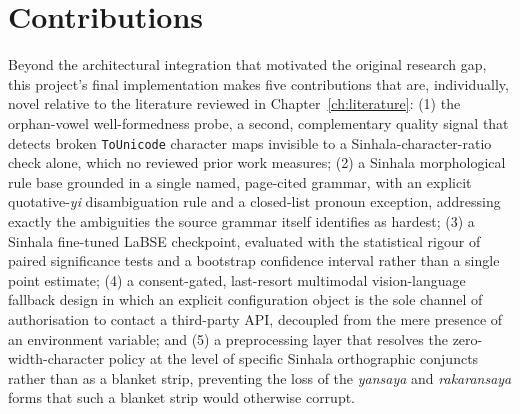 \documentclass[12pt,a4paper,oneside]{report}
\begin{document}
\section{Contributions}
\label{sec:concl-contributions}
Beyond the architectural integration that motivated the original research gap, this project's final implementation makes five contributions that are, individually, novel relative to the literature reviewed in Chapter~\ref{ch:literature}: (1) the orphan-vowel well-formedness probe, a second, complementary quality signal that detects broken \texttt{ToUnicode} character maps invisible to a Sinhala-character-ratio check alone, which no reviewed prior work measures; (2) a Sinhala morphological rule base grounded in a single named, page-cited grammar, with an explicit quotative-\textit{yi} disambiguation rule and a closed-list pronoun exception, addressing exactly the ambiguities the source grammar itself identifies as hardest; (3) a Sinhala fine-tuned LaBSE checkpoint, evaluated with the statistical rigour of paired significance tests and a bootstrap confidence interval rather than a single point estimate; (4) a consent-gated, last-resort multimodal vision-language fallback design in which an explicit configuration object is the sole channel of authorisation to contact a third-party API, decoupled from the mere presence of an environment variable; and (5) a preprocessing layer that resolves the zero-width-character policy at the level of specific Sinhala orthographic conjuncts rather than as a blanket strip, preventing the loss of the \textit{yansaya} and \textit{rakaransaya} forms that such a blanket strip would otherwise corrupt.
\end{document}
